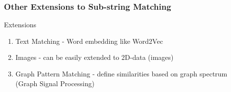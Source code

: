 \documentclass[10pt,xcolor=table]{beamer}
\newcommand{\xv}{\underline{x}}
\newcommand{\yv}{\underline{y}}
\begin{document}
%

\begin{frame}
\frametitle{Other Extensions to Sub-string Matching}

\begin{block}{Extensions}
	\begin{enumerate}
			\item Text Matching - Word embedding like Word2Vec
			\item Images - can be easily extended to 2D-data (images)
			\item Graph Pattern Matching  - define similarities based on graph spectrum (Graph Signal Processing)
	\end{enumerate}
\end{block}


\end{frame}
\end{document}
